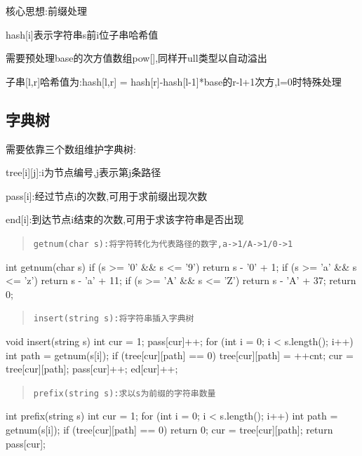 \documentclass[UTF8,a4paper,11pt]{ctexart}
\newcommand{\topic}[1]{%
  \par\needspace{3\baselineskip}\vspace{0.45em}%
  \noindent{\bfseries\color{Primary}#1}\par\vspace{0.12em}%
}
\begin{document}
核心思想:前缀处理

hash[i]表示字符串s前i位子串哈希值

需要预处理base的次方值数组pow[],同样开ull类型以自动溢出

子串[l,r]哈希值为:hash[l,r] = hash[r]-hash[l-1]*base的r-l+1次方,l=0时特殊处理

\subsection{字典树}

\topic{数组含义}

需要依靠三个数组维护字典树:

\begin{CodeBlock}
tree[i][j]:i为节点编号,j表示第j条路径
\end{CodeBlock}

pass[i]:经过节点i的次数,可用于求前缀出现次数

end[i]:到达节点i结束的次数,可用于求该字符串是否出现

\topic{基本操作}

\begin{quote}
\noindent\texttt{getnum(char s):将字符转化为代表路径的数字,a->1/A->1/0->1}
\end{quote}

\begin{CodeBlock}
int getnum(char s) {
    if (s >= '0' && s <= '9')
        return s - '0' + 1;
    if (s >= 'a' && s <= 'z')
        return s - 'a' + 11;
    if (s >= 'A' && s <= 'Z')
        return s - 'A' + 37;
    return 0;
}
\end{CodeBlock}

\begin{quote}
\noindent\texttt{insert(string s):将字符串插入字典树}
\end{quote}

\begin{CodeBlock}
void insert(string s) {
    int cur = 1;
    pass[cur]++;
    for (int i = 0; i < s.length(); i++) {
        int path = getnum(s[i]);
        if (tree[cur][path] == 0)
            tree[cur][path] = ++cnt;
        cur = tree[cur][path];
        pass[cur]++;
    }
    ed[cur]++;
}
\end{CodeBlock}

\begin{quote}
\noindent\texttt{prefix(string s):求以s为前缀的字符串数量}
\end{quote}

\begin{CodeBlock}
int prefix(string s) {
    int cur = 1;
    for (int i = 0; i < s.length(); i++) {
        int path = getnum(s[i]);
        if (tree[cur][path] == 0)
            return 0;
        cur = tree[cur][path];
    }
    return pass[cur];
}
\end{CodeBlock}
\end{document}
